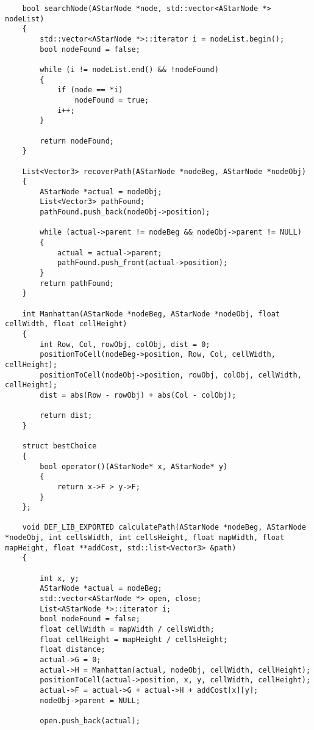 \begin{lstlisting}
    bool searchNode(AStarNode *node, std::vector<AStarNode *> nodeList)
    {
        std::vector<AStarNode *>::iterator i = nodeList.begin();
        bool nodeFound = false;
    
        while (i != nodeList.end() && !nodeFound)
        {
            if (node == *i)
                nodeFound = true;
            i++;
        }
    
        return nodeFound;
    }
    
    List<Vector3> recoverPath(AStarNode *nodeBeg, AStarNode *nodeObj)
    {
        AStarNode *actual = nodeObj;
        List<Vector3> pathFound;
        pathFound.push_back(nodeObj->position);
    
        while (actual->parent != nodeBeg && nodeObj->parent != NULL)
        {
            actual = actual->parent;
            pathFound.push_front(actual->position);
        }
        return pathFound;
    }
    
    int Manhattan(AStarNode *nodeBeg, AStarNode *nodeObj, float cellWidth, float cellHeight)
    {
        int Row, Col, rowObj, colObj, dist = 0;
        positionToCell(nodeBeg->position, Row, Col, cellWidth, cellHeight);
        positionToCell(nodeObj->position, rowObj, colObj, cellWidth, cellHeight);
        dist = abs(Row - rowObj) + abs(Col - colObj);
    
        return dist;
    }
    
    struct bestChoice
    {
        bool operator()(AStarNode* x, AStarNode* y)
        {
            return x->F > y->F;
        }
    };
    
    void DEF_LIB_EXPORTED calculatePath(AStarNode *nodeBeg, AStarNode *nodeObj, int cellsWidth, int cellsHeight, float mapWidth, float mapHeight, float **addCost, std::list<Vector3> &path)
    {
    
        int x, y;
        AStarNode *actual = nodeBeg;
        std::vector<AStarNode *> open, close;
        List<AStarNode *>::iterator i;
        bool nodeFound = false;
        float cellWidth = mapWidth / cellsWidth;
        float cellHeight = mapHeight / cellsHeight;
        float distance;
        actual->G = 0;
        actual->H = Manhattan(actual, nodeObj, cellWidth, cellHeight);
        positionToCell(actual->position, x, y, cellWidth, cellHeight);
        actual->F = actual->G + actual->H + addCost[x][y];
        nodeObj->parent = NULL;
    
        open.push_back(actual);
    

\end{lstlisting}
